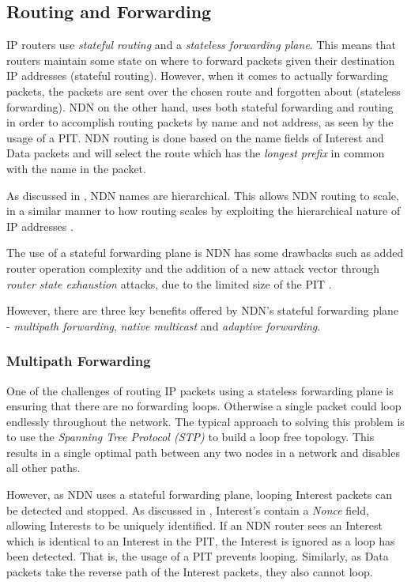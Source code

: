 \subsection{Routing and Forwarding}\label{sec:routing}
IP routers use \textit{stateful routing} and a \textit{stateless forwarding plane}. This means that routers maintain some state on where to forward packets given their destination IP addresses (stateful routing). However, when it comes to actually forwarding packets, the packets are sent over the chosen route and forgotten about (stateless forwarding). NDN on the other hand, uses both stateful forwarding and routing \cite{stateful-forwarding} in order to accomplish routing packets by name and not address, as seen by the usage of a PIT. NDN routing is done based on the name fields of Interest and Data packets and will select the route which has the \textit{longest prefix} in common with the name in the packet. 

As discussed in , NDN names are hierarchical. This allows NDN routing to scale, in a similar manner to how routing scales by exploiting the hierarchical nature of IP addresses \cite{stateful-forwarding}.

The use of a stateful forwarding plane is NDN has some drawbacks such as added router operation complexity and the addition of a new attack vector through \textit{router state exhaustion} attacks, due to the limited size of the PIT \cite{case-against-stateful-forwarding}. 

However, there are three key benefits offered by NDN's stateful forwarding plane - \textit{multipath forwarding}, \textit{native multicast} and \textit{adaptive forwarding}.

\subsubsection*{Multipath Forwarding} \label{sec:multipath-forwarding}
One of the challenges of routing IP packets using a stateless forwarding plane is ensuring that there are no forwarding loops. Otherwise a single packet could loop endlessly throughout the network. The typical approach to solving this problem is to use the \textit{Spanning Tree Protocol (STP)} \cite{spanning-tree-protocol} to build a loop free topology. This results in a single optimal path between any two nodes in a network and disables all other paths.

However, as NDN uses a stateful forwarding plane, looping Interest packets can be detected and stopped. As discussed in , Interest's contain a \textit{Nonce} field, allowing Interests to be uniquely identified. If an NDN router sees an Interest which is identical to an Interest in the PIT, the Interest is ignored as a loop has been detected. That is, the usage of a PIT prevents looping. Similarly, as Data packets take the reverse path of the Interest packets, they also cannot loop. 

